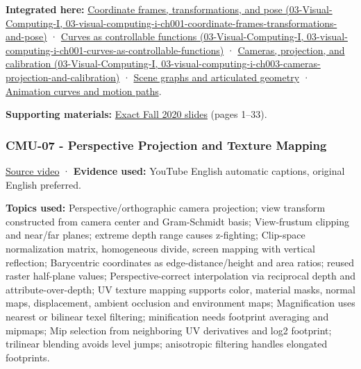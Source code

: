 \textbf{Integrated here:} \href{../03-Visual-Computing-I/main.pdf\#nameddest=03-visual-computing-i-ch001-coordinate-frames-transformations-and-pose}{Coordinate frames, transformations, and pose (03-Visual-Computing-I, 03-visual-computing-i-ch001-coordinate-frames-transformations-and-pose)} · \href{../03-Visual-Computing-I/main.pdf\#nameddest=03-visual-computing-i-ch001-curves-as-controllable-functions}{Curves as controllable functions (03-Visual-Computing-I, 03-visual-computing-i-ch001-curves-as-controllable-functions)} · \href{../03-Visual-Computing-I/main.pdf\#nameddest=03-visual-computing-i-ch003-cameras-projection-and-calibration}{Cameras, projection, and calibration (03-Visual-Computing-I, 03-visual-computing-i-ch003-cameras-projection-and-calibration)} · \hyperref[04-visual-computing-ii-ch029-scene-graphs-and-articulated-geometry]{Scene graphs and articulated geometry} · \hyperref[04-visual-computing-ii-ch029-animation-curves-and-motion-paths]{Animation curves and motion paths}.

\textbf{Supporting materials:} \href{https://15462.courses.cs.cmu.edu/fall2020content/lectures/06_3drotations/06_3drotations_slides.pdf}{Exact Fall 2020 slides} (pages 1--33).

\subsubsection{CMU-07 - Perspective Projection and Texture Mapping}\label{04-visual-computing-ii-ch036-cmu-07---perspective-projection-and-texture-mapping}

\href{https://www.youtube.com/watch?v=_4Q4O2Kgdo4}{Source video} · \textbf{Evidence used:} YouTube English automatic captions, original English preferred.

\textbf{Topics used:} Perspective/orthographic camera projection; view transform constructed from camera center and Gram-Schmidt basis; View-frustum clipping and near/far planes; extreme depth range causes z-fighting; Clip-space normalization matrix, homogeneous divide, screen mapping with vertical reflection; Barycentric coordinates as edge-distance/height and area ratios; reused raster half-plane values; Perspective-correct interpolation via reciprocal depth and attribute-over-depth; UV texture mapping supports color, material masks, normal maps, displacement, ambient occlusion and environment maps; Magnification uses nearest or bilinear texel filtering; minification needs footprint averaging and mipmaps; Mip selection from neighboring UV derivatives and log2 footprint; trilinear blending avoids level jumps; anisotropic filtering handles elongated footprints.

